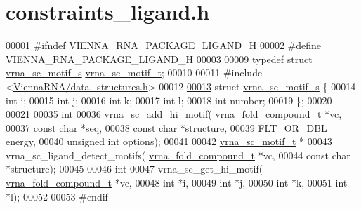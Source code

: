 \hypertarget{constraints__ligand_8h_source}{}\section{constraints\+\_\+ligand.\+h}
\label{constraints__ligand_8h_source}

\begin{DoxyCode}
00001 \textcolor{preprocessor}{#ifndef VIENNA\_RNA\_PACKAGE\_LIGAND\_H}
00002 \textcolor{preprocessor}{#define VIENNA\_RNA\_PACKAGE\_LIGAND\_H}
00003 
00009 \textcolor{keyword}{typedef} \textcolor{keyword}{struct }\hyperlink{structvrna__sc__motif__s}{vrna\_sc\_motif\_s}  \hyperlink{structvrna__sc__motif__s}{vrna\_sc\_motif\_t};
00010 
00011 \textcolor{preprocessor}{#include <\hyperlink{data__structures_8h}{ViennaRNA/data\_structures.h}>}
00012 
\hypertarget{constraints__ligand_8h_source.tex_l00013}{}\hyperlink{structvrna__sc__motif__s}{00013} \textcolor{keyword}{struct }\hyperlink{structvrna__sc__motif__s}{vrna\_sc\_motif\_s} \{
00014   \textcolor{keywordtype}{int} i;
00015   \textcolor{keywordtype}{int} j;
00016   \textcolor{keywordtype}{int} k;
00017   \textcolor{keywordtype}{int} l;
00018   \textcolor{keywordtype}{int} number;
00019 \};
00020 
00021 
00035 \textcolor{keywordtype}{int}
00036 \hyperlink{group__constraints__ligand_gaa6ff0113a3a76dc0b8d62961f4e1dfa0}{vrna\_sc\_add\_hi\_motif}( \hyperlink{group__fold__compound_structvrna__fc__s}{vrna\_fold\_compound\_t} *vc,
00037                       \textcolor{keyword}{const} \textcolor{keywordtype}{char} *seq,
00038                       \textcolor{keyword}{const} \textcolor{keywordtype}{char} *structure,
00039                       \hyperlink{group__data__structures_ga31125aeace516926bf7f251f759b6126}{FLT\_OR\_DBL} energy,
00040                       \textcolor{keywordtype}{unsigned} \textcolor{keywordtype}{int} options);
00041 
00042 \hyperlink{structvrna__sc__motif__s}{vrna\_sc\_motif\_t} *
00043 vrna\_sc\_ligand\_detect\_motifs( \hyperlink{group__fold__compound_structvrna__fc__s}{vrna\_fold\_compound\_t} *vc,
00044                               \textcolor{keyword}{const} \textcolor{keywordtype}{char} *structure);
00045 
00046 \textcolor{keywordtype}{int}
00047 vrna\_sc\_get\_hi\_motif( \hyperlink{group__fold__compound_structvrna__fc__s}{vrna\_fold\_compound\_t} *vc,
00048                       \textcolor{keywordtype}{int} *i,
00049                       \textcolor{keywordtype}{int} *j,
00050                       \textcolor{keywordtype}{int} *k,
00051                       \textcolor{keywordtype}{int} *l);
00052 
00053 \textcolor{preprocessor}{#endif}
\end{DoxyCode}
